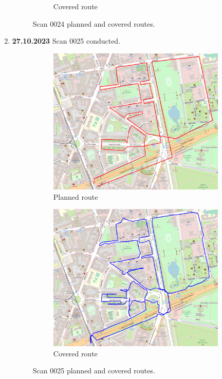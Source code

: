 \documentclass[a4paper,12pt]{book}
\begin{document}
\begin{enumerate}
\begin{figure}[H]
\begin{subfigure}{.80\textwidth}
			\caption{Covered route}
			\label{fig:b24}
		\end{subfigure}
		\caption{Scan 0024 planned and covered routes.}
		\label{fig:fig24}
	\end{figure}
	\item \textbf{27.10.2023} Scan 0025 conducted.
	\begin{figure}[H]
		\centering
		\begin{subfigure}{.84\textwidth}
			\centering
			\includegraphics[width=1\linewidth]{route_p25}
			\caption{Planned route}
			\label{fig:a25}
		\end{subfigure}%
		\linebreak
		\begin{subfigure}{.84\textwidth}
			\centering
			\includegraphics[width=1\linewidth]{route_c25}
			\caption{Covered route}
			\label{fig:b25}
		\end{subfigure}
		\caption{Scan 0025 planned and covered routes.}
		\label{fig:fig25}
	\end{figure}
\end{enumerate}
\end{document}
